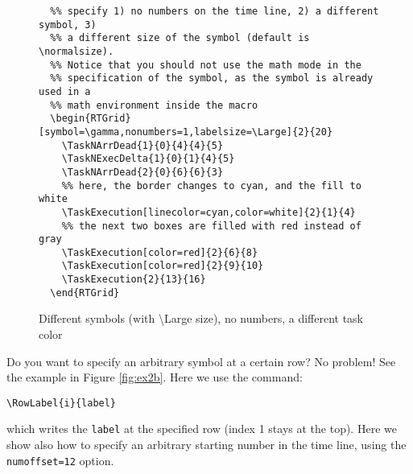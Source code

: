 \documentclass{article}
\begin{document}
\begin{figure}[!htbp]
  \centering
  \begin{RTGrid}[width=8cm,symbol=\gamma,nonumbers=1,labelsize=\small]{2}{20}
  \end{RTGrid}

\begin{verbatim}
  %% specify 1) no numbers on the time line, 2) a different symbol, 3)
  %% a different size of the symbol (default is \normalsize).
  %% Notice that you should not use the math mode in the
  %% specification of the symbol, as the symbol is already used in a
  %% math environment inside the macro
  \begin{RTGrid}[symbol=\gamma,nonumbers=1,labelsize=\Large]{2}{20}
    \TaskNArrDead{1}{0}{4}{4}{5}    
    \TaskNExecDelta{1}{0}{1}{4}{5}
    \TaskNArrDead{2}{0}{6}{6}{3}  
    %% here, the border changes to cyan, and the fill to white
    \TaskExecution[linecolor=cyan,color=white]{2}{1}{4}
    %% the next two boxes are filled with red instead of gray
    \TaskExecution[color=red]{2}{6}{8}
    \TaskExecution[color=red]{2}{9}{10}
    \TaskExecution{2}{13}{16}        
  \end{RTGrid}
\end{verbatim}
  \caption{Different symbols (with \textbackslash Large size), no numbers, a different
    task color}
  \label{fig:ex2a}
\end{figure}

Do you want to specify an arbitrary symbol at a certain row?
No problem! See the example in Figure \ref{fig:ex2b}. Here we use the command:
\begin{verbatim}
\RowLabel{i}{label}
\end{verbatim}
which writes the \texttt{label} at the specified row (index 1 stays at
the top). Here we show also how to specify an arbitrary starting
number in the time line, using the \texttt{numoffset=12} option.
\end{document}

